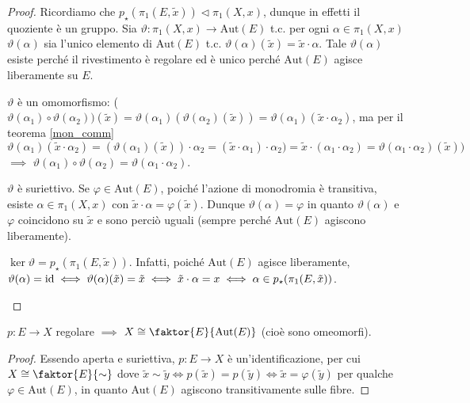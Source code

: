 \begin{proof}
  Ricordiamo che $p_{\star}(\pi_1(E, \tilde{x})) \vartriangleleft \pi_1(X, x)$, dunque in effetti il quoziente è un gruppo.
  Sia $\vartheta:\pi_1(X, x) \longrightarrow \text{Aut}(E)$ t.c. per ogni $\alpha \in \pi_1(X, x)$ $\vartheta(\alpha)$ sia l'unico elemento di $\text{Aut}(E)$ t.c. $\vartheta(\alpha)(\tilde{x})=\tilde{x} \cdot \alpha$.
  Tale $\vartheta(\alpha)$ esiste perché il rivestimento è regolare ed è unico perché $\text{Aut}(E)$ agisce liberamente su $E$.
  \begin{nlist}
    \item $\vartheta$ è un omomorfismo: ($\vartheta(\alpha_1) \circ \vartheta(\alpha_2))(\tilde{x})=\vartheta(\alpha_1)(\vartheta(\alpha_2)(\tilde{x}))=\vartheta(\alpha_1)(\tilde{x} \cdot \alpha_2)$,
    ma per il teorema \ref{mon_comm} $\vartheta(\alpha_1)(\tilde{x} \cdot \alpha_2)=(\vartheta(\alpha_1)(\tilde{x}))\cdot\alpha_2=(\tilde{x}\cdot\alpha_1)\cdot\alpha_2)=\tilde{x}\cdot(\alpha_1\cdot\alpha_2)=\vartheta(\alpha_1 \cdot \alpha_2)(\tilde{x}))$
    $\implies$ $\vartheta(\alpha_1)\circ\vartheta(\alpha_2)=\vartheta(\alpha_1 \cdot \alpha_2)$.
    \item $\vartheta$ è suriettivo. Se $\varphi \in \text{Aut}(E)$, poiché l'azione di monodromia è transitiva, esiste $\alpha \in \pi_1(X, x)$ con $\tilde{x} \cdot \alpha=\varphi(\tilde{x})$. Dunque $\vartheta(\alpha)=\varphi$ in quanto $\vartheta(\alpha)$ e $\varphi$ coincidono su $\tilde{x}$ e sono perciò uguali (sempre perché $\text{Aut}(E)$ agiscono liberamente).
    \item $\ker{\vartheta}=p_{\star}(\pi_1(E, \tilde{x}))$. Infatti, poiché $\text{Aut}(E)$ agisce liberamente, $\vartheta(\alpha)=\operatorname{id} \iff \vartheta(\alpha)(\tilde{x})=\tilde{x} \iff \tilde{x} \cdot \alpha=x \iff \alpha \in p_{\star}(\pi_1(E, \tilde{x}))$.
  \end{nlist}
\end{proof}

\begin{cor}
  $p:E \longrightarrow X$ regolare $\implies$ $X \cong \faktor{E}{\text{Aut}(E)}$ (cioè sono omeomorfi).
\end{cor}

\begin{proof}
  Essendo aperta e suriettiva, $p:E \longrightarrow X$ è un'identificazione, per cui $X \cong \faktor{E}{\sim}$ dove $\tilde{x} \sim \tilde{y} \iff p(\tilde{x})=p(\tilde{y}) \iff \tilde{x}=\varphi(\tilde{y})$ per qualche $\varphi \in \text{Aut}(E)$, in quanto $\text{Aut}(E)$ agiscono transitivamente sulle fibre.
\end{proof}

